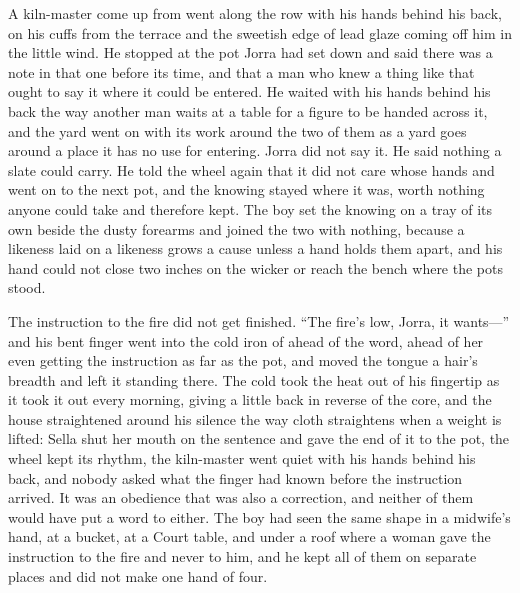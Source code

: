 A kiln-master come up from  went along the row with his hands behind his back,  on his cuffs from the terrace and the sweetish edge of lead glaze coming off him in the little wind. He stopped at the pot Jorra had set down and said there was a note in that one before its time, and that a man who knew a thing like that ought to say it where it could be entered. He waited with his hands behind his back the way another man waits at a table for a figure to be handed across it, and the yard went on with its work around the two of them as a yard goes around a place it has no use for entering. Jorra did not say it. He said nothing a slate could carry. He told the wheel again that it did not care whose hands and went on to the next pot, and the knowing stayed where it was, worth nothing anyone could take and therefore kept. The boy set the knowing on a tray of its own beside the dusty forearms and joined the two with nothing, because a likeness laid on a likeness grows a cause unless a hand holds them apart, and his hand could not close two inches on the wicker or reach the bench where the pots stood.

\scenebreak

The instruction to the fire did not get finished. “The fire's low, Jorra, it wants---” and his bent finger went into the cold iron of  ahead of the word, ahead of her even getting the instruction as far as the pot, and moved the tongue a hair's breadth and left it standing there. The cold took the heat out of his fingertip as it took it out every morning, giving a little back in reverse of the core, and the house straightened around his silence the way cloth straightens when a weight is lifted: Sella shut her mouth on the sentence and gave the end of it to the pot, the wheel kept its rhythm, the kiln-master went quiet with his hands behind his back, and nobody asked what the finger had known before the instruction arrived. It was an obedience that was also a correction, and neither of them would have put a word to either. The boy had seen the same shape in a midwife's hand, at a bucket, at a Court table, and under a roof where a woman gave the instruction to the fire and never to him, and he kept all of them on separate places and did not make one hand of four.

